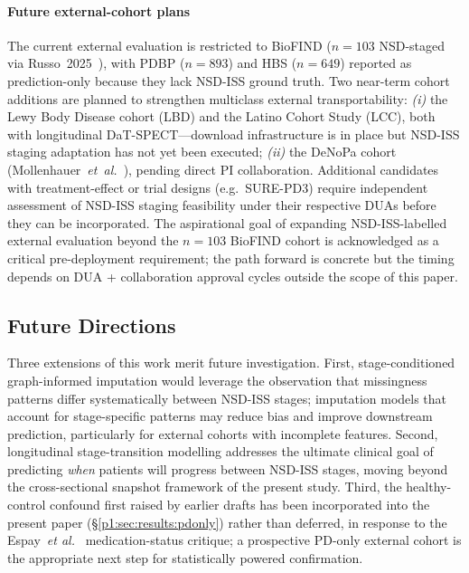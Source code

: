 \paragraph*{Future external-cohort plans} The current external evaluation is restricted to BioFIND ($n{=}103$ NSD-staged via Russo~2025~\cite{russo2025}), with PDBP ($n{=}893$) and HBS ($n{=}649$) reported as prediction-only because they lack NSD-ISS ground truth. Two near-term cohort additions are planned to strengthen multiclass external transportability: \textit{(i)} the Lewy Body Disease cohort (LBD) and the Latino Cohort Study (LCC), both with longitudinal DaT-SPECT---download infrastructure is in place but NSD-ISS staging adaptation has not yet been executed; \textit{(ii)} the DeNoPa cohort (Mollenhauer~\textit{et~al.}~\cite{mollenhauer2017}), pending direct PI collaboration. Additional candidates with treatment-effect or trial designs (e.g.~SURE-PD3) require independent assessment of NSD-ISS staging feasibility under their respective DUAs before they can be incorporated. The aspirational goal of expanding NSD-ISS-labelled external evaluation beyond the $n{=}103$ BioFIND cohort is acknowledged as a critical pre-deployment requirement; the path forward is concrete but the timing depends on DUA + collaboration approval cycles outside the scope of this paper.

\subsection{Future Directions}
Three extensions of this work merit future investigation. First, stage-conditioned graph-informed imputation would leverage the observation that missingness patterns differ systematically between NSD-ISS stages; imputation models that account for stage-specific patterns may reduce bias and improve downstream prediction, particularly for external cohorts with incomplete features. Second, longitudinal stage-transition modelling addresses the ultimate clinical goal of predicting \emph{when} patients will progress between NSD-ISS stages, moving beyond the cross-sectional snapshot framework of the present study. Third, the healthy-control confound first raised by earlier drafts has been incorporated into the present paper (\S\ref{p1:sec:results:pdonly}) rather than deferred, in response to the Espay~\textit{et al.}~\cite{espay2025med} medication-status critique; a prospective PD-only external cohort is the appropriate next step for statistically powered confirmation.

